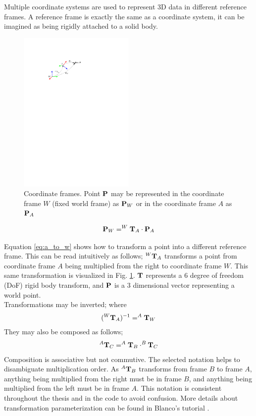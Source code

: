 Multiple coordinate systems are used to represent 3D data in different reference frames.  A reference frame is exactly the same as a coordinate system, it can be imagined as being rigidly attached to a solid body.

\begin{figure}[h]
  \centering
      \includegraphics[width=0.5\textwidth]{chapters/images/coord_sys}
  \caption{Coordinate frames. Point $\mathbf{P}$ may be represented in the coordinate frame  $W$ (fixed world frame) as $\mathbf{P}_W$ or in the coordinate frame $A$ as $\mathbf{P}_A$}
  \label{fig:coord_sys}
\end{figure}

\begin{align}
 \mathbf{P}_W = ^W\mathbf{T}_A \cdot \mathbf{P}_A
 \label{eq:a_to_w}
\end{align}

Equation \ref{eq:a_to_w} shows how to transform a point into a different reference frame.  This can be read intuitively as follows; $^W\mathbf{T}_A$ transforms a point from coordinate frame $A$ being multiplied from the right to coordinate frame $W$.  This same transformation is visualized in Fig. \ref{fig:coord_sys}.  $\mathbf{T}$ represents a 6 degree of freedom (DoF) rigid body transform, and $\mathbf{P}$ is a 3 dimensional vector representing a world point. \\
Transformations may be inverted; where 
\begin{align}
 (^W\mathbf{T}_A)^{-1} = ^A\mathbf{T}_W
\end{align}
They may also be composed as follows; 
\begin{align}
 ^A\mathbf{T}_C = ^A\mathbf{T}_B \cdot ^B\mathbf{T}_C
\end{align}
Composition is associative but not commutive.  The selected notation helps to disambiguate multiplication order.  As $^A\mathbf{T}_B$ transforms from frame $B$ to frame $A$, anything being multiplied from the right must be in frame $B$, and anything being multiplied from the left must be in frame $A$.  This notation is consistent throughout the thesis and in the code to avoid confusion. More details about transformation parameterization can be found in Blanco's tutorial \cite{blanco_12}.

